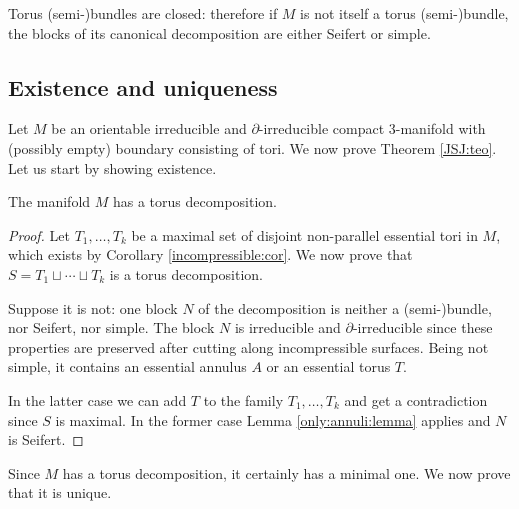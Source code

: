 \begin{oss}
Torus (semi-)bundles are closed: therefore if $M$ is not itself a torus (semi-)bundle, the blocks of its canonical decomposition are either Seifert or simple.
\end{oss}

\subsection{Existence and uniqueness}
Let  $M$ be an orientable irreducible and $\partial$-irreducible compact 3-manifold with (possibly empty) boundary consisting of tori. We now prove Theorem \ref{JSJ:teo}. Let us start by showing existence.
\begin{prop}
The manifold $M$ has a torus decomposition.
\end{prop}
\begin{proof}
Let $T_1,\ldots, T_k$ be a maximal set of disjoint non-parallel essential tori in $M$, which exists by Corollary \ref{incompressible:cor}. We now prove that $S=T_1 \sqcup \cdots \sqcup T_k$ is a torus decomposition.

Suppose it is not: one block $N$ of the decomposition is neither a (semi-)bundle, nor Seifert, nor simple. The block $N$ is irreducible and $\partial$-irreducible since these properties are preserved after cutting along incompressible surfaces. Being not simple, it contains an essential annulus $A$ or an essential torus $T$. 

In the latter case we can add $T$ to the family $T_1,\ldots, T_k$ and get a contradiction since $S$ is maximal. In the former case Lemma \ref{only:annuli:lemma} applies and $N$ is Seifert.
\end{proof}

Since $M$ has a torus decomposition, it certainly has a minimal one. We now prove that it is unique.

